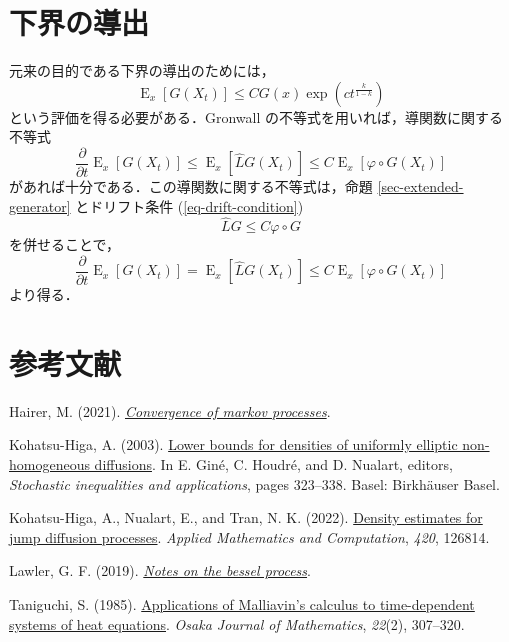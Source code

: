 \documentclass[
]{article}
\newlength{\cslhangindent}
\newenvironment{CSLReferences}[2] %
 {\begin{list}{}{%
  \setlength{\itemindent}{0pt}
  \setlength{\leftmargin}{0pt}
  \setlength{\parsep}{0pt}
  \ifodd #1
   \setlength{\leftmargin}{\cslhangindent}
   \setlength{\itemindent}{-1\cslhangindent}
  \fi
  \setlength{\itemsep}{#2\baselineskip}}}
 {\end{list}}
\begin{document}
\section{下界の導出}\label{sec-Gronwall}

元来の目的である下界の導出のためには， \[
\operatorname{E}_x[G(X_t)]\le CG(x)\exp\left(ct^{\frac{k}{1-k}}\right)
\] という評価を得る必要がある．Gronwall
の不等式を用いれば，導関数に関する不等式 \[
\frac{\partial }{\partial t}\operatorname{E}_x[G(X_t)]\le\operatorname{E}_x[\widehat{L}G(X_t)]\le C\operatorname{E}_x[\varphi\circ G(X_t)]
\] があれば十分である．この導関数に関する不等式は，命題
\ref{sec-extended-generator} とドリフト条件 (\ref{eq-drift-condition})
\[
\widehat{L}G\le C\varphi\circ G
\] を併せることで， \[
\frac{\partial }{\partial t}\operatorname{E}_x[G(X_t)]=\operatorname{E}_x[\widehat{L}G(X_t)]\le C\operatorname{E}_x[\varphi\circ G(X_t)]
\] より得る．

\section*{参考文献}\label{ux53c2ux8003ux6587ux732e}

\label{refs}
\begin{CSLReferences}{1}{1}
Hairer, M. (2021).
\emph{\href{https://www.hairer.org/notes/Convergence.pdf}{Convergence of
markov processes}}.

Kohatsu-Higa, A. (2003).
\href{https://doi.org/10.1007/978-3-0348-8069-5_18}{Lower bounds for
densities of uniformly elliptic non-homogeneous diffusions}. In E. Giné,
C. Houdré, and D. Nualart, editors, \emph{Stochastic inequalities and
applications}, pages 323--338. Basel: Birkh{ä}user Basel.

Kohatsu-Higa, A., Nualart, E., and Tran, N. K. (2022).
\href{https://doi.org/10.1016/j.amc.2021.126814}{Density estimates for
jump diffusion processes}. \emph{Applied Mathematics and Computation},
\emph{420}, 126814.

Lawler, G. F. (2019).
\emph{\href{https://www.math.uchicago.edu/~lawler/bessel18new.pdf}{Notes
on the bessel process}}.

Taniguchi, S. (1985).
\href{https://projecteuclid.org/journals/osaka-journal-of-mathematics/volume-22/issue-2/Applications-of-Malliavins-calculus-to-time-dependent-systems-of-heat/ojm/1200778261.full}{{Applications
of Malliavin's calculus to time-dependent systems of heat equations}}.
\emph{Osaka Journal of Mathematics}, \emph{22}(2), 307--320.

\end{CSLReferences}
\end{document}
